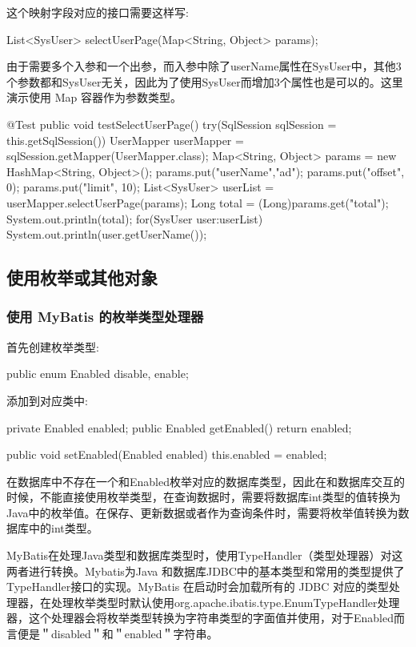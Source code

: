 这个映射字段对应的接口需要这样写:
\begin{sql}
List<SysUser> selectUserPage(Map<String, Object> params);
\end{sql}

由于需要多个入参和一个出参，而入参中除了userName属性在SysUser中，其他3个参数都和SysUser无关，因此为了使用SysUser而增加3个属性也是可以的。这里演示使用 Map 容器作为参数类型。

\begin{Java}
@Test
public void testSelectUserPage() {
    try(SqlSession sqlSession = this.getSqlSession()) {
        UserMapper userMapper = sqlSession.getMapper(UserMapper.class);
        Map<String, Object> params = new HashMap<String, Object>();
        params.put("userName","ad");
        params.put("offset", 0);
        params.put("limit", 10);
        List<SysUser> userList = userMapper.selectUserPage(params);
        Long total = (Long)params.get("total");
        System.out.println(total);
        for(SysUser user:userList){
            System.out.println(user.getUserName());
        }
    }
}
\end{Java}

\subsection{使用枚举或其他对象}

\subsubsection{使用 MyBatis 的枚举类型处理器}

首先创建枚举类型:

\begin{Java}
public enum Enabled {
    disable, enable;
}
\end{Java}

添加到对应类中:

\begin{Java}
private Enabled enabled;
public Enabled getEnabled() {
    return enabled;
}

public void setEnabled(Enabled enabled) {
    this.enabled = enabled;
}
\end{Java}

在数据库中不存在一个和Enabled枚举对应的数据库类型，因此在和数据库交互的时候，不能直接使用枚举类型，在查询数据时，需要将数据库int类型的值转换为Java中的枚举值。在保存、更新数据或者作为查询条件时，需要将枚举值转换为数据库中的int类型。

MyBatis在处理Java类型和数据库类型时，使用TypeHandler（类型处理器）对这两者进行转换。Mybatis为Java 和数据库JDBC中的基本类型和常用的类型提供了TypeHandler接口的实现。MyBatis 在启动时会加载所有的 JDBC 对应的类型处理器，在处理枚举类型时默认使用org.apache.ibatis.type.EnumTypeHandler处理器，这个处理器会将枚举类型转换为字符串类型的字面值并使用，对于Enabled而言便是＂disabled＂和＂enabled＂字符串。


